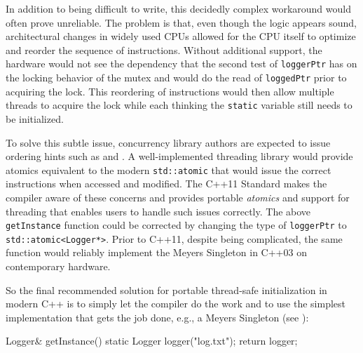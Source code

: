 In addition to
being difficult to write, this decidedly complex workaround would often
prove unreliable. The problem is that, even though the logic appears
sound, architectural changes in widely used CPUs allowed for the CPU
itself to optimize and reorder the sequence of instructions. Without
additional support, the hardware would not see the dependency that the
second test of \lstinline!loggerPtr! has on the locking behavior of the
mutex and would do the read of \lstinline!loggedPtr! prior to acquiring the
lock. This reordering of instructions
would then allow multiple threads to acquire the lock while each thinking the
\lstinline!static! variable still needs to be initialized.

To solve this subtle issue, concurrency library authors are expected to
issue ordering hints such as  and . A
well-implemented threading library would provide atomics equivalent to
the modern \lstinline!std::atomic! that would issue the correct
instructions when accessed and modified. The C++11 Standard makes the
compiler aware of these concerns and provides portable \emph{atomics}
and support for threading that enables users to handle such issues
correctly. The above \lstinline!getInstance! function could be corrected by
changing the type of \lstinline!loggerPtr! to
\lstinline!std::atomic<Logger*>!. Prior to C++11, despite being
complicated, the same function would reliably implement the Meyers
Singleton in C++03 on contemporary hardware.

So the final recommended solution for portable thread-safe
initialization in modern C++ is to simply let the compiler do the work
and to use the simplest implementation that gets the job done, e.g., a
Meyers Singleton (see ):

\begin{emcppslisting}[emcppsbatch=e17]
Logger& getInstance()
{
    static Logger logger("log.txt");
    return logger;
}
\end{emcppslisting}


